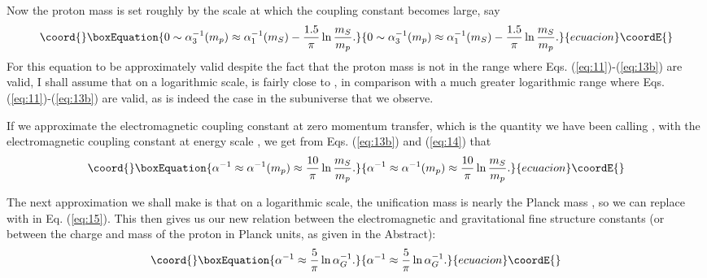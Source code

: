 \documentclass[a4paper,12pt]{article}
\begin{document}
	Now the proton mass is set roughly by the scale \myHighlight{$\mu$}\coordHE{} at which
the \coordHE{} coupling constant \coordHE{} becomes large, say
 \begin{equation}\coord{}\boxEquation{
 0 \sim \alpha_3^{-1}(m_p)
   \approx \alpha_1^{-1}(m_S) - {1.5\over\pi}\ln{m_S\over m_p}.
 \label{eq:14}
 }{
 0 \sim \alpha_3^{-1}(m_p)
   \approx \alpha_1^{-1}(m_S) - {1.5\over\pi}\ln{m_S\over m_p}.
 }{ecuacion}\coordE{}\end{equation}
For this equation to be approximately valid despite the fact
that the proton mass \coordHE{} is not in the range
\coordHE{} where Eqs. (\ref{eq:11})-(\ref{eq:13b}) are valid,
I shall assume that on a logarithmic scale,
\coordHE{} is fairly close to \coordHE{}, in comparison with
a much greater logarithmic range where
Eqs. (\ref{eq:11})-(\ref{eq:13b}) are valid,
as is indeed the case in the subuniverse that we observe.

	If we approximate the electromagnetic coupling constant
at zero momentum transfer,
which is the quantity we have been calling \myHighlight{$\alpha$}\coordHE{},
with the electromagnetic coupling constant at energy scale
\coordHE{}, we get from Eqs. (\ref{eq:13b}) and (\ref{eq:14}) that
 \begin{equation}\coord{}\boxEquation{
 \alpha^{-1} \approx \alpha^{-1}(m_p)
             \approx {10\over\pi}\ln{m_S\over m_p}.
 \label{eq:15}
 }{
 \alpha^{-1} \approx \alpha^{-1}(m_p)
             \approx {10\over\pi}\ln{m_S\over m_p}.
 }{ecuacion}\coordE{}\end{equation}
 
 	The next approximation we shall make is that on a logarithmic
scale, the unification mass \coordHE{} is nearly the Planck mass \coordHE{},
so we can replace \coordHE{} with
\coordHE{} in Eq. (\ref{eq:15}).
This then gives us our new relation between
the electromagnetic and gravitational fine structure constants
(or between the charge and mass of the proton in Planck units,
as given in the Abstract):
 \begin{equation}\coord{}\boxEquation{
 \alpha^{-1} \approx {5\over\pi}\ln{\alpha_G^{-1}}.
 \label{eq:16}
 }{
 \alpha^{-1} \approx {5\over\pi}\ln{\alpha_G^{-1}}.
 }{ecuacion}\coordE{}\end{equation}
 
\end{document}
